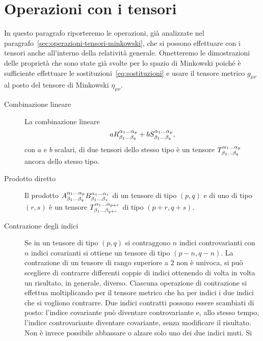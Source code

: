 \section{Operazioni con i tensori}
\label{sec:operazioni-tensori}

In questo paragrafo riporteremo le operazioni, già analizzate nel
paragrafo~\ref{sec:operazioni-tensori-minkowski}, che si possono effettuare con
i tensori anche all'interno della relatività generale.  Ometteremo le
dimostrazioni delle proprietà che sono state già svolte per lo spazio di
Minkowski poiché è sufficiente effettuare le
sostituzioni~\eqref{eq:sostituzioni} e usare il tensore metrico $g_{\mu\nu}$ al
posto del tensore di Minkowski $\eta_{\mu\nu}$.

\begin{description}
\item[Combinazione lineare] La combinazione lineare
  \begin{equation}
    a \tensor*{R}{^{\alpha_{1}\dots\alpha_{p}}_{\beta_{1}\dots\beta_{q}}} + b
    \tensor*{S}{^{\alpha_{1}\dots\alpha_{p}}_{\beta_{1}\dots\beta_{q}}},
  \end{equation}
  con $a$ e $b$ scalari, di due tensori dello stesso tipo è un tensore
  $\tensor*{T}{^{\alpha_{1}\dots\alpha_{p}}_{\beta_{1}\dots\beta_{q}}}$ ancora
  dello stesso tipo.
\item[Prodotto diretto] Il prodotto
  $\tensor*{A}{^{\alpha_{1}\dots\alpha_{p}}_{\beta_{1}\dots\beta_{q}}}
  \tensor*{B}{^{\alpha_{1}\dots\alpha_{r}}_{\beta_{1}\dots\beta_{s}}}$
  di un tensore di tipo $(p,q)$ e di uno di tipo $(r,s)$ è un tensore
  $\tensor*{T}{^{\alpha_{1}\dots\alpha_{p+r}}_{\beta_{1}\dots\beta_{q+s}}}$ di
  tipo $(p+r,q+s)$.
\item[Contrazione degli indici] Se in un tensore
  di tipo $(p,q)$ si contraggono $n$ indici controvarianti con $n$ indici
  covarianti si ottiene un tensore di tipo $(p-n,q-n)$.  La contrazione di un
  tensore di rango superiore a $2$ non è univoca, si può scegliere di contrarre
  differenti coppie di indici ottenendo di volta in volta un risultato, in
  generale, diverso.  Ciascuna operazione di contrazione si effettua
  moltiplicando per il tensore metrico che ha per indici i due indici che si
  vogliono contrarre.  Due indici contratti possono essere scambiati di posto:
  l'indice covariante può diventare controvariante e, allo stesso tempo,
  l'indice controvariante diventare covariante, senza modificare il risultato.
  Non è invece possibile abbassare o alzare solo uno dei due indici muti.  Si

\end{description}
